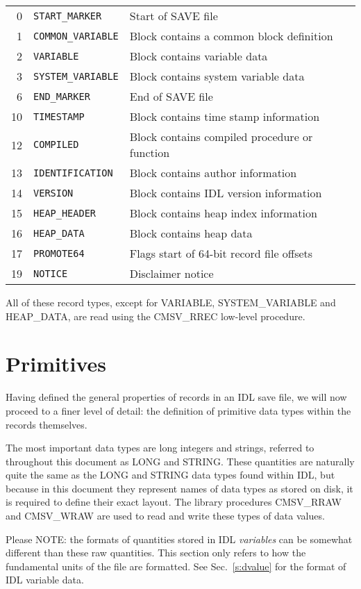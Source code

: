 \documentclass[12pt]{article}
\begin{document}
\begin{tabular}{rll}
0  & {\tt START\_MARKER} & Start of SAVE file\\
1  & {\tt COMMON\_VARIABLE} & Block contains a common block definition\\
2  & {\tt VARIABLE} & Block contains variable data\\
3  & {\tt SYSTEM\_VARIABLE} & Block contains system variable data\\
6  & {\tt END\_MARKER} & End of SAVE file\\
10 & {\tt TIMESTAMP} & Block contains time stamp information\\
12 & {\tt COMPILED} & Block contains compiled procedure or function\\
13 & {\tt IDENTIFICATION} & Block contains author information\\
14 & {\tt VERSION} & Block contains IDL version information\\
15 & {\tt HEAP\_HEADER} & Block contains heap index information\\
16 & {\tt HEAP\_DATA} & Block contains heap data\\
17 & {\tt PROMOTE64} & Flags start of 64-bit record file offsets\\
19 & {\tt NOTICE} & Disclaimer notice\\
\end{tabular}

All of these record types, except for VARIABLE, SYSTEM\_VARIABLE and
HEAP\_DATA, are read using the CMSV\_RREC low-level procedure.

\section{Primitives\label{s:primatives}}

Having defined the general properties of records in an IDL save file,
we will now proceed to a finer level of detail: the definition of
primitive data types within the records themselves.

The most important data types are long integers and strings, referred
to throughout this document as LONG and STRING.  These quantities are
naturally quite the same as the LONG and STRING data types found
within IDL, but because in this document they represent names of data
types as stored on disk, it is required to define their exact layout.
The library procedures CMSV\_RRAW and CMSV\_WRAW are used to read and
write these types of data values.

Please NOTE: the formats of quantities stored in IDL {\it variables}
can be somewhat different than these raw quantities.  This section
only refers to how the fundamental units of the file are formatted.
See Sec.~\ref{s:dvalue} for the format of IDL variable data.
\end{document}
